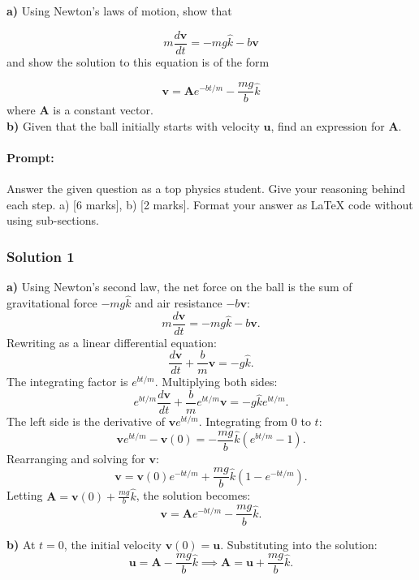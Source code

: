 \documentclass{article}
\begin{document}
\textbf{a)} Using Newton's laws of motion, show that

\[
m \frac{d \mathbf{v}}{dt} = -mg \hat{k} - b \mathbf{v}
\]
and show the solution to this equation is of the form

\[
\mathbf{v} = \mathbf{A} e^{-bt/m} - \frac{mg}{b} \hat{k}
\]
where $\mathbf{A}$ is a constant vector.\\

\textbf{b)} Given that the ball initially starts with velocity $\mathbf{u}$, find an expression for $\mathbf{A}$.

\paragraph{Prompt: \\} 
Answer the given question as a top physics student. Give your reasoning behind each step. a) [6 marks], b) [2 marks].
Format your answer as LaTeX code without using sub-sections.

\subsubsection{Solution 1}

\textbf{a)} Using Newton's second law, the net force on the ball is the sum of gravitational force $-mg \hat{k}$ and air resistance $-b \mathbf{v}$:
\[
m \frac{d \mathbf{v}}{dt} = -mg \hat{k} - b \mathbf{v}.
\]
Rewriting as a linear differential equation:
\[
\frac{d \mathbf{v}}{dt} + \frac{b}{m} \mathbf{v} = -g \hat{k}.
\]
The integrating factor is $e^{bt/m}$. Multiplying both sides:
\[
e^{bt/m} \frac{d \mathbf{v}}{dt} + \frac{b}{m} e^{bt/m} \mathbf{v} = -g \hat{k} e^{bt/m}.
\]
The left side is the derivative of $\mathbf{v} e^{bt/m}$. Integrating from $0$ to $t$:
\[
\mathbf{v} e^{bt/m} - \mathbf{v}(0) = -\frac{mg}{b} \hat{k} \left(e^{bt/m} - 1\right).
\]
Rearranging and solving for $\mathbf{v}$:
\[
\mathbf{v} = \mathbf{v}(0) e^{-bt/m} + \frac{mg}{b} \hat{k} \left(1 - e^{-bt/m}\right).
\]
Letting $\mathbf{A} = \mathbf{v}(0) + \frac{mg}{b} \hat{k}$, the solution becomes:
\[
\mathbf{v} = \mathbf{A} e^{-bt/m} - \frac{mg}{b} \hat{k}.
\]

\textbf{b)} At $t = 0$, the initial velocity $\mathbf{v}(0) = \mathbf{u}$. Substituting into the solution:
\[
\mathbf{u} = \mathbf{A} - \frac{mg}{b} \hat{k} \implies \mathbf{A} = \mathbf{u} + \frac{mg}{b} \hat{k}.
\]

\end{document}
